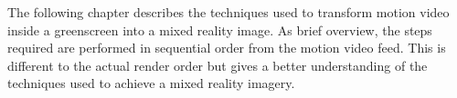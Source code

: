 The following chapter describes the techniques used to transform motion video 
inside a greenscreen into a mixed reality image. As brief overview, the steps 
required are performed in sequential order from the motion video feed. This is 
different to the actual render order but gives a better understanding of the 
techniques used to achieve a mixed reality imagery.

